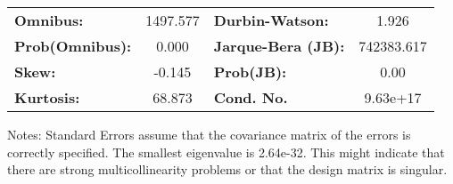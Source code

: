 \begin{center}
\begin{tabular}{lcccccc}
\bottomrule
\end{tabular}
\begin{tabular}{lclc}
\textbf{Omnibus:}       & 1497.577 & \textbf{  Durbin-Watson:     } &     1.926   \\
\textbf{Prob(Omnibus):} &   0.000  & \textbf{  Jarque-Bera (JB):  } & 742383.617  \\
\textbf{Skew:}          &  -0.145  & \textbf{  Prob(JB):          } &      0.00   \\
\textbf{Kurtosis:}      &  68.873  & \textbf{  Cond. No.          } &  9.63e+17   \\
\bottomrule
\end{tabular}
\end{center}

Notes: \newline
 [1] Standard Errors assume that the covariance matrix of the errors is correctly specified. \newline
 [2] The smallest eigenvalue is 2.64e-32. This might indicate that there are \newline
 strong multicollinearity problems or that the design matrix is singular.